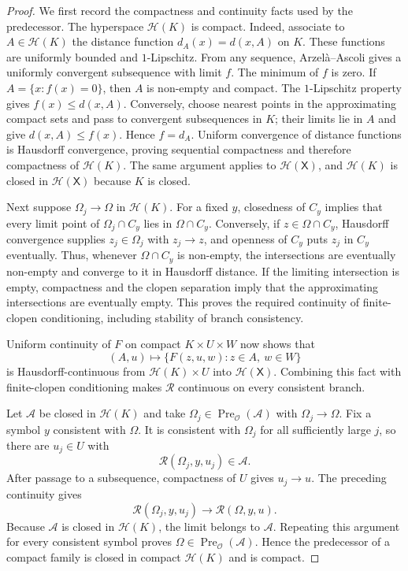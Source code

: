 \documentclass[11pt]{article}
\theoremstyle{definition}
\newcommand{\Pre}{\operatorname{Pre}}
\begin{document}
\begin{proof}
We first record the compactness and continuity facts used by the predecessor. The hyperspace $\mathcal H(K)$ is compact. Indeed, associate to $A\in\mathcal H(K)$ the distance function $d_A(x)=d(x,A)$ on $K$. These functions are uniformly bounded and $1$-Lipschitz. From any sequence, Arzel\`a--Ascoli gives a uniformly convergent subsequence with limit $f$. The minimum of $f$ is zero. If $A=\{x:f(x)=0\}$, then $A$ is non-empty and compact. The $1$-Lipschitz property gives $f(x)\le d(x,A)$. Conversely, choose nearest points in the approximating compact sets and pass to convergent subsequences in $K$; their limits lie in $A$ and give $d(x,A)\le f(x)$. Hence $f=d_A$. Uniform convergence of distance functions is Hausdorff convergence, proving sequential compactness and therefore compactness of $\mathcal H(K)$. The same argument applies to $\mathcal H(\mathsf X)$, and $\mathcal H(K)$ is closed in $\mathcal H(\mathsf X)$ because $K$ is closed.

Next suppose $\Omega_j\to\Omega$ in $\mathcal H(K)$. For a fixed $y$, closedness of $C_y$ implies that every limit point of $\Omega_j\cap C_y$ lies in $\Omega\cap C_y$. Conversely, if $z\in\Omega\cap C_y$, Hausdorff convergence supplies $z_j\in\Omega_j$ with $z_j\to z$, and openness of $C_y$ puts $z_j$ in $C_y$ eventually. Thus, whenever $\Omega\cap C_y$ is non-empty, the intersections are eventually non-empty and converge to it in Hausdorff distance. If the limiting intersection is empty, compactness and the clopen separation imply that the approximating intersections are eventually empty. This proves the required continuity of finite-clopen conditioning, including stability of branch consistency.

Uniform continuity of $F$ on compact $K\times U\times W$ now shows that
\[
(A,u)\longmapsto\{F(z,u,w):z\in A,\ w\in W\}
\]
is Hausdorff-continuous from $\mathcal H(K)\times U$ into $\mathcal H(\mathsf X)$. Combining this fact with finite-clopen conditioning makes $\mathscr R$ continuous on every consistent branch.

Let $\mathcal A$ be closed in $\mathcal H(K)$ and take $\Omega_j\in\Pre_{\mathcal O}(\mathcal A)$ with $\Omega_j\to\Omega$. Fix a symbol $y$ consistent with $\Omega$. It is consistent with $\Omega_j$ for all sufficiently large $j$, so there are $u_j\in U$ with
\[
\mathscr R(\Omega_j,y,u_j)\in\mathcal A.
\]
After passage to a subsequence, compactness of $U$ gives $u_j\to u$. The preceding continuity gives
\[
\mathscr R(\Omega_j,y,u_j)\longrightarrow\mathscr R(\Omega,y,u).
\]
Because $\mathcal A$ is closed in $\mathcal H(K)$, the limit belongs to $\mathcal A$. Repeating this argument for every consistent symbol proves $\Omega\in\Pre_{\mathcal O}(\mathcal A)$. Hence the predecessor of a compact family is closed in compact $\mathcal H(K)$ and is compact.


\end{proof}
\end{document}
